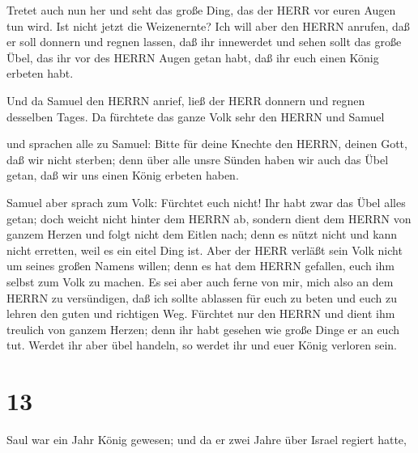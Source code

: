  Tretet auch nun her und seht das große Ding, das der HERR
vor euren Augen tun wird.  Ist nicht jetzt die Weizenernte?
Ich will aber den HERRN anrufen, daß er soll donnern und regnen lassen,
daß ihr innewerdet und sehen sollt das große Übel, das ihr vor des HERRN
Augen getan habt, daß ihr euch einen König erbeten habt.

 Und da Samuel den HERRN anrief, ließ der HERR donnern und
regnen desselben Tages. Da fürchtete das ganze Volk sehr den HERRN und
Samuel

 und sprachen alle zu Samuel: Bitte für deine Knechte den
HERRN, deinen Gott, daß wir nicht sterben; denn über alle unsre Sünden
haben wir auch das Übel getan, daß wir uns einen König erbeten haben.

 Samuel aber sprach zum Volk: Fürchtet euch nicht! Ihr habt
zwar das Übel alles getan; doch weicht nicht hinter dem HERRN ab,
sondern dient dem HERRN von ganzem Herzen  und folgt nicht
dem Eitlen nach; denn es nützt nicht und kann nicht erretten, weil es
ein eitel Ding ist.  Aber der HERR verläßt sein Volk nicht
um seines großen Namens willen; denn es hat dem HERRN gefallen, euch ihm
selbst zum Volk zu machen.  Es sei aber auch ferne von mir,
mich also an dem HERRN zu versündigen, daß ich sollte ablassen für euch
zu beten und euch zu lehren den guten und richtigen Weg. 
Fürchtet nur den HERRN und dient ihm treulich von ganzem Herzen; denn
ihr habt gesehen wie große Dinge er an euch tut.  Werdet
ihr aber übel handeln, so werdet ihr und euer König verloren sein.

\hypertarget{section-12}{%
\section{13}\label{section-12}}

 Saul war ein Jahr König gewesen; und da er zwei Jahre über
Israel regiert hatte,

